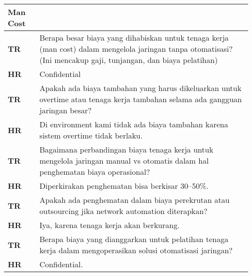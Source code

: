 \begin{longtable}{|p{4cm}|p{10cm}|}
    \textbf{Man Cost} & \\
    \hline
    \textbf{TR} & Berapa besar biaya yang dihabiskan untuk tenaga kerja (man cost) dalam mengelola jaringan tanpa otomatisasi? (Ini mencakup gaji, tunjangan, dan biaya pelatihan) \\
    \textbf{HR} & Confidential \\
    \hline
    \textbf{TR} & Apakah ada biaya tambahan yang harus dikeluarkan untuk overtime atau tenaga kerja tambahan selama ada gangguan jaringan besar? \\
    \textbf{HR} & Di environment kami tidak ada biaya tambahan karena sistem overtime tidak berlaku. \\
    \hline
    \textbf{TR} & Bagaimana perbandingan biaya tenaga kerja untuk mengelola jaringan manual vs otomatis dalam hal penghematan biaya operasional? \\
    \textbf{HR} & Diperkirakan penghematan bisa berkisar 30–50\%. \\
    \hline
    \textbf{TR} & Apakah ada penghematan dalam biaya perekrutan atau outsourcing jika network automation diterapkan? \\
    \textbf{HR} & Iya, karena tenaga kerja akan berkurang. \\
    \hline
    \textbf{TR} & Berapa biaya yang dianggarkan untuk pelatihan tenaga kerja dalam mengoperasikan solusi otomatisasi jaringan? \\
    \textbf{HR} & Confidential. \\
    \hline


\end{longtable}

